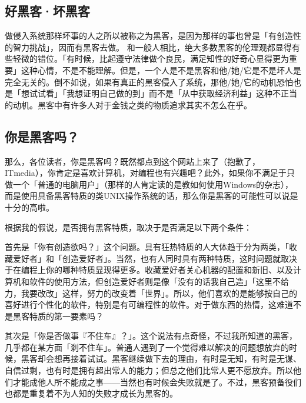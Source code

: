 \documentclass[a4paper,12pt]{article}
\begin{document}
\subsection{好黑客·坏黑客}
做侵入系统那样坏事的人之所以被称之为黑客，是因为那样的事也曾是「有创造性的智力挑战」，因而有黑客去做。
和一般人相比，绝大多数黑客的伦理观都显得有些轻微的错位。「有时候，比起遵守法律做个良民，满足知性的好奇心显得更为重要」这种心情，不是不能理解。但是，一个人是不是黑客和他/她/它是不是坏人是完全无关的。倒不如说，如果有真正的黑客侵入了系统，那他/她/它的动机恐怕也是「想试试看」「我想证明自己做的到」而不是「从中获取经济利益」这种不正当的动机。黑客中有许多人对于金钱之类的物质追求其实不怎么在乎。

\subsection{你是黑客吗？}
那么，各位读者，你是黑客吗？既然都点到这个网站上来了（抱歉了，ITmedia），你肯定是喜欢计算机，对编程也有兴趣吧？此外，如果你不满足于只做一个「普通的电脑用户」（那样的人肯定读的是教如何使用Windows的杂志），而是使用具备黑客特质的类UNIX操作系统的话，那么你是黑客的可能性可以说是十分的高啦。

根据我的假说，是否拥有黑客特质，取决于是否满足以下两个条件：

首先是「你有创造欲吗？」这个问题。具有狂热特质的人大体趋于分为两类，「收藏爱好者」和「创造爱好者」。当然，也有人同时具有两种特质，这时问题就取决于在编程上你的哪种特质显现得更多。收藏爱好者关心机器的配置和新旧、以及计算机和软件的使用方法，但创造爱好者则是像「没有的话我自己造」「这里不给力，我要改改」这样，努力的改变着「世界」。所以，他们喜欢的是能够按自己的喜好进行个性化的软件，特别是有可编程性的软件。对于做东西的热情，这难道不是黑客特质的第一要素吗？

其次是「你是否做事『不住车』？」。这个说法有点奇怪，不过我所知道的黑客，几乎都在某方面「刹不住车」。普通人遇到了一个觉得难以解决的问题想放弃的时候，黑客却会想再接着试试。黑客继续做下去的理由，有时是无知，有时是无谋、自信过剩，也有时是拥有超出常人的能力；但总之他们比常人更不愿放弃。所以他们才能成他人所不能成之事——当然也有时候会失败就是了。不过，黑客预备役们也都是重复着不为人知的失败才成长为黑客的。
\end{document}
